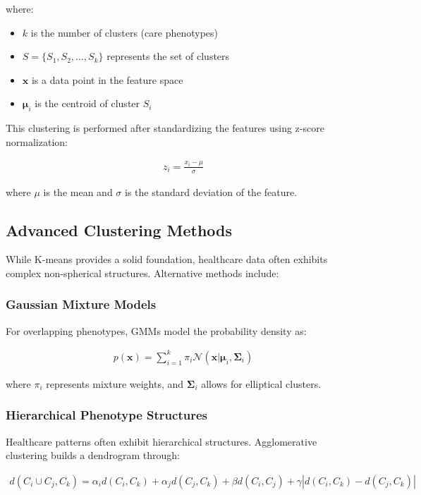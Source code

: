 \documentclass[12pt]{article}
\begin{document}
where:
\begin{itemize}
    \item $k$ is the number of clusters (care phenotypes)
    \item $S = \{S_1, S_2, \ldots, S_k\}$ represents the set of clusters
    \item $\mathbf{x}$ is a data point in the feature space
    \item $\boldsymbol{\mu}_i$ is the centroid of cluster $S_i$
\end{itemize}

This clustering is performed after standardizing the features using z-score normalization:

\begin{align}
z_i = \frac{x_i - \mu}{\sigma}
\end{align}

where $\mu$ is the mean and $\sigma$ is the standard deviation of the feature.

\subsection{Advanced Clustering Methods}

While K-means provides a solid foundation, healthcare data often exhibits complex non-spherical structures. Alternative methods include:

\subsubsection{Gaussian Mixture Models}

For overlapping phenotypes, GMMs model the probability density as:

\begin{align}
p(\mathbf{x}) = \sum_{i=1}^{k} \pi_i \mathcal{N}(\mathbf{x}|\boldsymbol{\mu}_i, \boldsymbol{\Sigma}_i)
\end{align}

where $\pi_i$ represents mixture weights, and $\boldsymbol{\Sigma}_i$ allows for elliptical clusters.

\subsubsection{Hierarchical Phenotype Structures}

Healthcare patterns often exhibit hierarchical structures. Agglomerative clustering builds a dendrogram through:

\begin{align}
d(C_i \cup C_j, C_k) = \alpha_i d(C_i, C_k) + \alpha_j d(C_j, C_k) + \beta d(C_i, C_j) + \gamma |d(C_i, C_k) - d(C_j, C_k)|
\end{align}
\end{document}
